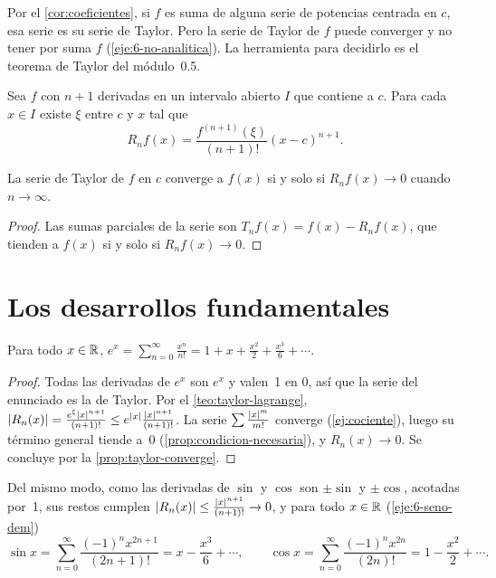 Por el \cref{cor:coeficientes}, si $f$ es suma de alguna serie de potencias centrada en $c$, esa serie es su serie de Taylor. Pero la serie de Taylor de $f$ puede converger y no tener por suma $f$ (\cref{eje:6-no-analitica}). La herramienta para decidirlo es el teorema de Taylor del módulo~0.5.

\begin{teorema}\label{teo:taylor-lagrange}
Sea $f$ con $n+1$ derivadas en un intervalo abierto $I$ que contiene a $c$. Para cada $x\in I$ existe $\xi$ entre $c$ y $x$ tal que
\[
R_nf(x)=\frac{f^{(n+1)}(\xi)}{(n+1)!}(x-c)^{n+1}.
\]
\end{teorema}

\begin{proposicion}\label{prop:taylor-converge}
La serie de Taylor de $f$ en $c$ converge a $f(x)$ si y solo si $R_nf(x)\to0$ cuando $n\to\infty$.
\end{proposicion}

\begin{proof}
Las sumas parciales de la serie son $T_nf(x)=f(x)-R_nf(x)$, que tienden a $f(x)$ si y solo si $R_nf(x)\to0$.
\end{proof}

\section{Los desarrollos fundamentales}

\begin{teorema}[Exponencial]\label{teo:exp}
Para todo $x\in\mathbb{R}$, $\displaystyle e^{x}=\sum_{n=0}^{\infty}\frac{x^{n}}{n!}=1+x+\frac{x^{2}}{2}+\frac{x^{3}}{6}+\cdots$.
\end{teorema}

\begin{proof}
Todas las derivadas de $e^{x}$ son $e^{x}$ y valen~1 en $0$, así que la serie del enunciado es la de Taylor. Por el \cref{teo:taylor-lagrange}, $\lvert R_n(x)\rvert=\frac{e^{\xi}\lvert x\rvert^{n+1}}{(n+1)!}\le e^{\lvert x\rvert}\frac{\lvert x\rvert^{n+1}}{(n+1)!}$. La serie $\sum\frac{\lvert x\rvert^{m}}{m!}$ converge (\cref{ej:cociente}), luego su término general tiende a~$0$ (\cref{prop:condicion-necesaria}), y $R_n(x)\to0$. Se concluye por la \cref{prop:taylor-converge}.
\end{proof}

Del mismo modo, como las derivadas de $\sin$ y $\cos$ son $\pm\sin$ y $\pm\cos$, acotadas por~1, sus restos cumplen $\lvert R_n(x)\rvert\le\frac{\lvert x\rvert^{n+1}}{(n+1)!}\to0$, y para todo $x\in\mathbb{R}$ (\cref{eje:6-seno-dem})
\[
\sin x=\sum_{n=0}^{\infty}\frac{(-1)^{n}x^{2n+1}}{(2n+1)!}=x-\frac{x^{3}}{6}+\cdots,\qquad
\cos x=\sum_{n=0}^{\infty}\frac{(-1)^{n}x^{2n}}{(2n)!}=1-\frac{x^{2}}{2}+\cdots.
\]

